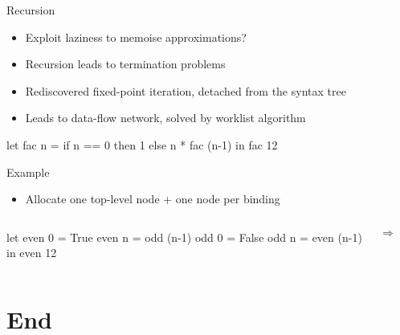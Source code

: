 \documentclass{haskellbeamer}
\begin{document}
\begin{frame}[fragile]{Recursion}
  \begin{itemize}
    \item Exploit laziness to memoise approximations?
    \item[\xmark] Recursion leads to termination problems
    \item Rediscovered fixed-point iteration, detached from the syntax tree
    \item Leads to data-flow network, solved by worklist algorithm
  \end{itemize}
  \begin{center}
    \begin{minipage}{0.5\textwidth}
      \begin{haskell}
        let fac n = 
              if n == 0
                then 1
                else n * fac (n-1)
        in fac 12
      \end{haskell}
    \end{minipage}
  \end{center}
\end{frame}

\begin{frame}[fragile]{Example}
  \begin{itemize}
    \item Allocate one top-level node + one node per  binding
  \end{itemize}
  \begin{columns}
    \begin{column}{0.35\textwidth}
      \begin{haskell}
        let even 0 = True
            even n = odd (n-1)
            odd 0 = False
            odd n = even (n-1)
        in even 12
      \end{haskell}
    \end{column}
    \begin{column}{0.05\textwidth}
      {\Huge$\Rightarrow$}
    \end{column}
    \begin{column}{0.35\textwidth}
    \end{column}
  \end{columns}
    
\end{frame}

\section{End}
\end{document}
